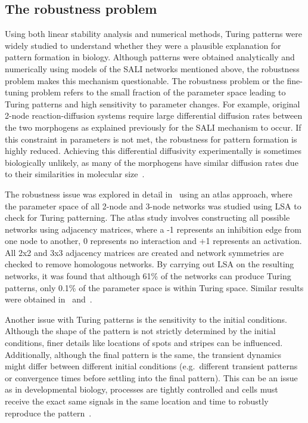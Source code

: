 \subsection{The robustness problem}

Using both linear stability analysis and numerical methods, Turing patterns were widely studied to understand whether they were a plausible explanation for pattern formation in biology.
Although patterns were obtained analytically and numerically using models of the SALI networks mentioned above, the robustness problem makes this mechanism questionable.
The robustness problem or the fine-tuning problem refers to the small fraction of the parameter space leading to Turing patterns and high sensitivity to parameter changes.
For example, original 2-node reaction-diffusion systems require large differential diffusion rates between the two morphogens as explained previously for the SALI mechanism to occur.
If this constraint in parameters is not met, the robustness for pattern formation is highly reduced.
Achieving this differential diffusivity experimentally is sometimes biologically unlikely, as many of the morphogens have similar diffusion rates due to their similarities in molecular size~\parencite{huidobro}.

The robustness issue was explored in detail in~\cite{Scholes2019} using an atlas approach, where the parameter space of all 2-node and 3-node networks was studied using LSA to check for Turing patterning.
The atlas study involves constructing all possible networks using adjacency matrices, where a -1 represents an inhibition edge from one node to another, 0 represents no interaction and +1 represents an activation.
All 2x2 and 3x3 adjacency matrices are created and network symmetries are checked to remove homologous networks.
By carrying out LSA on the resulting networks, it was found that although 61\% of the networks can produce Turing patterns, only 0.1\% of the parameter space is within Turing space.
Similar results were obtained in~\cite{Zheng2016} and~\cite{Marcon}.


Another issue with Turing patterns is the sensitivity to the initial conditions.
Although the shape of the pattern is not strictly determined by the initial conditions, finer details like locations of spots and stripes can be influenced.
Additionally, although the final pattern is the same, the transient dynamics might differ between different initial conditions (e.g.~different transient patterns or convergence times before settling into the final pattern).
This can be an issue as in developmental biology, processes are tightly controlled and cells must receive the exact same signals in the same location and time to robustly reproduce the pattern~\parencite{perrimon2012signaling}.



